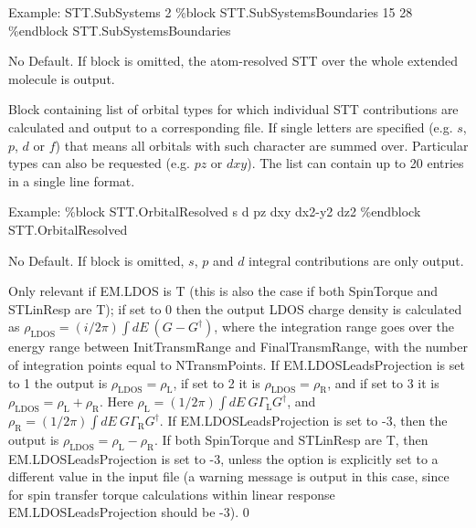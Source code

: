 \documentclass[11pt]{article}
\begin{document}
{{\begin{flushleft}
Example:\linebreak
{\ttfamily
STT.SubSystems   2\linebreak
\%block STT.SubSystemsBoundaries 15  28 \linebreak
\%endblock STT.SubSystemsBoundaries}
\end{flushleft}}
{No Default. If block is omitted, the atom-resolved STT over the whole extended molecule is output.}

{Block containing list of orbital types for which individual STT contributions are calculated and output to a corresponding  file. If single letters are specified (e.g. $s$, $p$, $d$ or $f$) that means all orbitals with such character are summed over. Particular types can also be requested (e.g. $pz$ or $dxy$). The list can contain up to 20 entries in a single line format.

\begin{flushleft}
Example:\linebreak
{\ttfamily
\%block STT.OrbitalResolved\linebreak
s d pz dxy dx2-y2 dz2 \linebreak
\%endblock STT.OrbitalResolved}
\end{flushleft}}
{No Default. If block is omitted, $s$, $p$ and $d$ integral contributions are only output.}

{Only relevant if EM.LDOS is T (this is also the case if both SpinTorque and STLinResp are T); if set to 0 then the output LDOS charge density is calculated as $\rho_\mathrm{LDOS}=(i/2\pi)\int dE~\left(G - G^\dagger\right)$, where the integration range goes over the energy range between InitTransmRange and FinalTransmRange, with the number of integration  points equal to NTransmPoints. If EM.LDOSLeadsProjection is set to 1 the output is $\rho_\mathrm{LDOS}=\rho_\mathrm{L}$, if set to 2 it is $\rho_\mathrm{LDOS}=\rho_\mathrm{R}$, and if set to 3 it is $\rho_\mathrm{LDOS}=\rho_\mathrm{L}+\rho_\mathrm{R}$. Here $\rho_\mathrm{L}=(1/2\pi)\int dE~G \Gamma_\mathrm{L} G^\dagger$, and  $\rho_\mathrm{R}=(1/2\pi)\int dE~G \Gamma_\mathrm{R} G^\dagger$. If EM.LDOSLeadsProjection is set to -3, then the output is $\rho_\mathrm{LDOS}=\rho_\mathrm{L}-\rho_\mathrm{R}$. If both SpinTorque and STLinResp are T, then EM.LDOSLeadsProjection is set to -3, unless the option is explicitly set to a different value in the input file (a warning message is output in this case, since for spin transfer torque calculations within linear response EM.LDOSLeadsProjection should be -3).}
{0}

}
\end{document}
